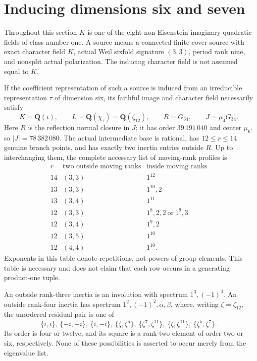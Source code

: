 \section{Inducing dimensions six and seven}
\label{sec:rank-six-seven-inducing}

Throughout this section $K$ is one of the eight non-Eisenstein
imaginary quadratic fields of class number one.  A source means
a connected finite-cover source with exact character field $K$,
actual Weil sixfold signature $(3,3)$, period rank nine, and
nonsplit actual polarization.  The inducing character field is
not assumed equal to $K$.

\begin{theorem}
\label{D-BI-16}
If the coefficient representation of such a source is induced
from an irreducible representation $\tau$ of dimension six,
its faithful image and character field necessarily satisfy
\[
 K=\mathbf Q(i),\qquad
 L=\mathbf Q(\chi_\tau)=\mathbf Q(\zeta_{12}),\qquad
 R=G_{34},\qquad J=\mu_4G_{34}.                              \tag{BI.53}
\]
Here $R$ is the reflection normal closure in $J$; it has order
$39\,191\,040$ and center $\mu_6$, so $|J|=78\,382\,080$.
The actual intermediate base is rational, has $12\le r\le14$
genuine branch points, and has exactly two inertia entries outside
$R$.  Up to interchanging them, the complete necessary list of
moving-rank profiles is
\[
\begin{array}{c|c|c}
 r&\text{two outside moving ranks}&\text{inside moving ranks}\\\hline
14&(3,3)&1^{12}\\
13&(3,3)&1^{10},2\\
13&(3,4)&1^{11}\\
12&(3,3)&1^8,2,2\ \text{or}\ 1^9,3\\
12&(3,4)&1^9,2\\
12&(3,5)&1^{10}\\
12&(4,4)&1^{10}.
\end{array}                                                  \tag{BI.54}
\]
Exponents in this table denote repetitions, not powers of group
elements.  This table is necessary and does not claim that each
row occurs in a generating product-one tuple.

An outside rank-three inertia is an involution with spectrum
$1^3,(-1)^3$.  An outside rank-four inertia has spectrum
$1^2,(-1)^2,\alpha,\beta$, where, writing
$\zeta=\zeta_{12}$, the unordered residual pair is one of
\[
 \{i,i\},\ \{-i,-i\},\ \{i,-i\},\
 \{\zeta,\zeta^5\},\ \{\zeta^7,\zeta^{11}\},\
 \{\zeta,\zeta^{11}\},\ \{\zeta^5,\zeta^7\}.             \tag{BI.55}
\]
Its order is four or twelve, and its square is a rank-two
element of order two or six, respectively.  None of these
possibilities is asserted to occur merely from the eigenvalue
list.
\end{theorem}
